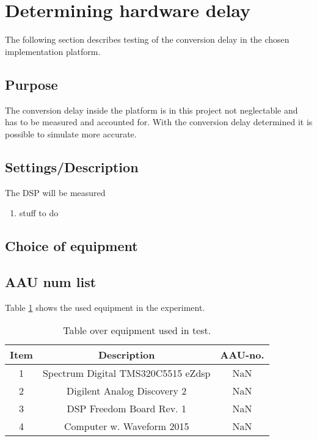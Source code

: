 \section{Determining hardware delay} \label{sec:HardwareDelay}

The following section describes testing of the conversion delay in the chosen implementation platform.

\subsection{Purpose}

The conversion delay inside the platform is in this project not neglectable and has to be measured and accounted for. With the conversion delay determined it is possible to simulate more accurate. %


\subsection{Settings/Description}

The DSP will be measured 

\begin{enumerate}
	\item stuff to do
\end{enumerate}







\subsection{Choice of equipment}


\subsection{AAU num list}
Table \ref{tab:MeasDelayTable} shows the used equipment in the experiment. 
\begin{table}[H]
	\centering
	\begin{tabular}{ c c c } \toprule
		{Item}	& {Description} 						& {AAU-no}. \\ \bottomrule 
		1	&	Spectrum Digital TMS320C5515 eZdsp	& NaN	\\
		2	&	Digilent Analog Discovery 2	& NaN		\\
		3	&	DSP Freedom Board Rev. 1 & NaN		\\
		4	&	Computer w. Waveform 2015					& NaN		\\
		\bottomrule
	\end{tabular}
	\caption{Table over equipment used in test.}
	\label{tab:MeasDelayTable}
\end{table}

